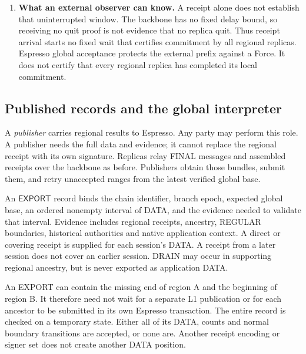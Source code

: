 \documentclass[11pt,a4paper]{article}
\newcommand{\tagg}[1]{\ensuremath{\mathsf{#1}}}
\newcommand{\defterm}[1]{\textcolor{rrBlue}{\textit{#1}}}
\begin{document}
\begin{enumerate}[label=(\arabic*),itemsep=4pt]
\item \textbf{What an external observer can know.} A receipt alone
does not establish that uninterrupted window. The backbone has no
fixed delay bound, so receiving no quit proof is not evidence that no
replica quit. Thus receipt arrival starts no fixed wait that certifies
commitment by all regional replicas. Espresso global acceptance protects the external prefix against a Force.
It does not certify that every regional replica has completed its local
commitment.
\end{enumerate}



\subsection{Published records and the global interpreter}
\label{sec:exports}
A \defterm{publisher} carries regional results to Espresso. Any party
may perform this role. A publisher needs the full data and evidence;
it cannot replace the regional receipt with its own signature.
Replicas relay FINAL messages and assembled receipts over the backbone
as before. Publishers obtain those bundles, submit them, and retry
unaccepted ranges from the latest verified global base.

An \tagg{EXPORT} record binds the chain identifier, branch epoch,
expected global base, an ordered nonempty interval of DATA, and the
evidence needed to validate that interval. Evidence includes regional
receipts, ancestry, REGULAR boundaries, historical authorities and
native application context. A direct or covering receipt is supplied
for each session's DATA. A receipt from a later session does not cover
an earlier session. DRAIN may occur in supporting regional ancestry,
but is never exported as application DATA.

An EXPORT can contain the missing end of region A and the beginning
of region B. It therefore need not wait for a separate L1 publication
or for each ancestor to be submitted in its own Espresso transaction.
The entire record is checked on a temporary state. Either all of its
DATA, counts and normal boundary transitions are accepted, or none are.
Another receipt encoding or signer set does not create another DATA
position.
\end{document}
